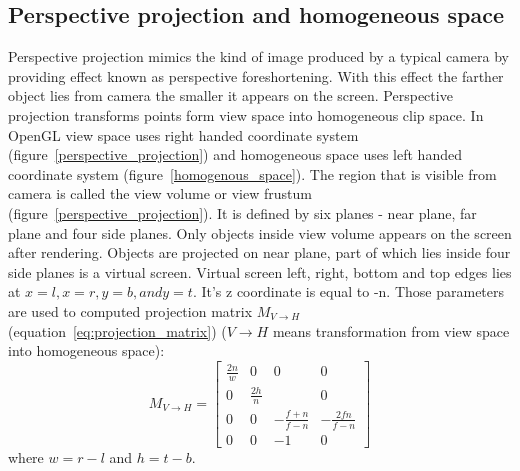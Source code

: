 \subsection{Perspective projection and homogeneous space}
Perspective projection mimics the kind of image produced by a typical camera by providing effect known as perspective foreshortening. With this effect the farther object lies from camera the smaller it appears on the screen. 
Perspective projection transforms points form view space into homogeneous clip space. In OpenGL view space uses right handed coordinate system (figure~\ref{perspective_projection}) and homogeneous space uses left handed coordinate system (figure~\ref{homogenous_space}). 
The region that is visible from camera is called the view volume or view frustum (figure~\ref{perspective_projection}). It is defined by six  planes - near plane, far plane and four side planes. Only objects inside view volume appears on the screen after rendering. Objects are projected on near plane, part of which lies inside four side planes is a virtual screen.
Virtual screen left, right, bottom and top edges lies at $x=l, x=r, y=b, and y=t$. It's z coordinate is equal to -n. Those parameters are used to computed projection matrix $M_{V \to H }$ (equation~\ref{eq:projection_matrix}) ($V \to H$ means transformation from view space into homogeneous space):
\begin{equation}
\label{eq:projection_matrix}
M_{V \to H } = 
\begin{bmatrix}
\frac{2n}{w} & 0            & 0                & 0                \\ 
0            & \frac{2h}{n} &                  & 0                 \\ 
0            & 0            & -\frac{f+n}{f-n} & -\frac{2fn}{f-n} \\ 
0            & 0            & -1               & 0
\end{bmatrix}
\end{equation}
where $w=r-l$ and $h=t-b$.





